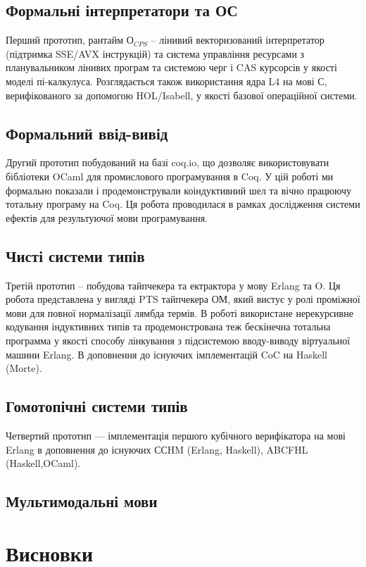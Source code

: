 \subsection{Формальні інтерпретатори та ОС}
Перший прототип, рантайм $О_{CPS}$ -- лінивий
векторизований інтерпретатор (підтримка SSE/AVX інструкцій) та система
управління ресурсами з планувальником лінивих програм
та системою черг і CAS курсорсів у якості моделі пі-калкулуса. Розглядається також
використання ядра L4 на мові С, верифікованого за допомогою HOL/Isabell,
у якості базової операційної системи.

\subsection{Формальний ввід-вивід}
Другий прототип побудований на базі coq.io, що дозволяє
використовувати бібліотеки OCaml для промислового програмування в Coq.
У цій роботі ми формально показали і продемонстрували коіндуктивний шел
та вічно працюючу тотальну програму на Coq. Ця робота проводилася
в рамках дослідження системи ефектів для результуючої мови програмування.

\subsection{Чисті системи типів}
Третій прототип -- побудова тайпчекера та ектрактора у мову Erlang та O.
Ця робота представлена у вигляді PTS тайпчекера ОМ, який вистує у ролі
проміжної мови для повної нормалізації лямбда термів. В роботі використане
нерекурсивне кодування індуктивних типів та продемонстрована теж бескінечна
тотальна программа у якості способу лінкування з підсистемою вводу-виводу
віртуальної машини Erlang. В доповнення до існуючих імплементацій CoC
на Haskell (Morte).

\subsection{Гомотопічні системи типів}
Четвертий прототип --- імплементація першого кубічного верифікатора на
мові Erlang в доповнення до існуючих ССHM (Erlang, Haskell),
ABCFHL (Haskell,OCaml).

\subsection{Мультимодальні мови}

\newpage
\section{Висновки}

